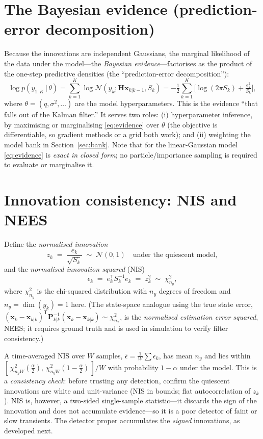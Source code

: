 \documentclass[11pt]{article}
\newcommand{\Norm}{\mathcal{N}}
\newcommand{\T}{^{\mathsf{T}}}
\newcommand{\given}{\,|\,}
\newcommand{\half}{\tfrac{1}{2}}
\begin{document}
\section{The Bayesian evidence (prediction-error decomposition)}
\label{sec:evidence}

Because the innovations are independent Gaussians, the marginal likelihood of the data
under the model---the \emph{Bayesian evidence}---factorises as the product of the
one-step predictive densities (the ``prediction-error decomposition''):
\begin{equation}
  \log p(y_{1:K}\given \theta)
  = \sum_{k=1}^{K}\log\Norm(y_k; \bm{H}\bm{x}_{k|k-1}, S_k)
  = -\half\sum_{k=1}^{K}\Big[\log(2\pi S_k) + \tfrac{e_k^2}{S_k}\Big],
  \label{eq:evidence}
\end{equation}
where $\theta=(q,\sigma^2,\dots)$ are the model hyperparameters. This is the evidence
``that falls out of the Kalman filter.'' It serves two roles: (i) hyperparameter
inference, by maximising or marginalising \eqref{eq:evidence} over $\theta$ (the
objective is differentiable, so gradient methods or a grid both work); and (ii)
weighting the model bank in Section~\ref{sec:bank}. Note that for the linear-Gaussian
model \eqref{eq:evidence} is \emph{exact in closed form}; no particle/importance
sampling is required to evaluate or marginalise it.

\section{Innovation consistency: NIS and NEES}
\label{sec:nis}

Define the \emph{normalised innovation}
\begin{equation}
  z_k \;=\; \frac{e_k}{\sqrt{S_k}} \;\sim\; \Norm(0,1)\quad\text{under the quiescent model},
\end{equation}
and the \emph{normalised innovation squared} (NIS)
\begin{equation}
  \epsilon_k \;=\; e_k\T S_k^{-1} e_k \;=\; z_k^2 \;\sim\; \chi^2_{n_y},
\end{equation}
where $\chi^2_{n_y}$ is the chi-squared distribution with $n_y$ degrees of freedom and
$n_y=\dim(y_k)=1$ here. (The state-space analogue using the true state error,
$(\bm{x}_k-\bm{x}_{k|k})\T\bm{P}_{k|k}^{-1}(\bm{x}_k-\bm{x}_{k|k})\sim\chi^2_{n_x}$, is
the \emph{normalised estimation error squared}, NEES; it requires ground truth and is
used in simulation to verify filter consistency.)

A time-averaged NIS over $W$ samples, $\bar\epsilon=\tfrac1W\sum\epsilon_k$, has mean
$n_y$ and lies within $[\,\chi^2_{n_y W}(\tfrac\alpha2),\,\chi^2_{n_y W}(1-\tfrac\alpha2)\,]/W$
with probability $1-\alpha$ under the model. This is a \emph{consistency check}:
before trusting any detection, confirm the quiescent innovations are white and
unit-variance (NIS in bounds; flat autocorrelation of $z_k$). NIS is, however, a
two-sided single-sample statistic---it discards the sign of the innovation and does
not accumulate evidence---so it is a poor detector of faint or slow transients. The
detector proper accumulates the \emph{signed} innovations, as developed next.
\end{document}
